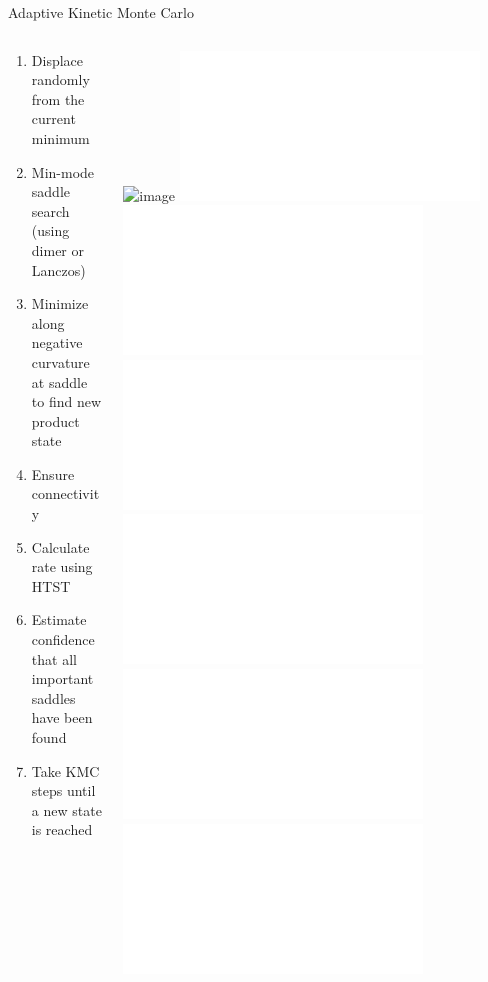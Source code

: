 \documentclass[onlymath]{beamer}
\begin{document}
\begin{frame}{Adaptive Kinetic Monte Carlo}
 \begin{columns}
    \begin{column}[l]{0.65\textwidth}
\begin{tcolorbox}[title=Algorithm,colback=white,colframe=black,]
\begin{enumerate}
	\item \alert<2-3,11>{Displace randomly from the current minimum}
	\item \alert<4-5>{Min-mode saddle search (using dimer or Lanczos)}
	\item \alert<6>{Minimize along negative curvature at saddle to find new product state}
	\item \alert<7>{Ensure connectivity}
	\item \alert<8>{Calculate rate using HTST}
	\item \alert<9,11>{Estimate confidence that all important saddles have been found}
	\item \alert<10>{Take KMC steps until a new state is reached}
\end{enumerate}
\end{tcolorbox}
         \end{column}
    \begin{column}[r]{0.35\textwidth}
        \includegraphics<1>[width=\columnwidth]{images/pes.png}
        \includegraphics<2>[width=\columnwidth]{images/minmode-basins-2.pdf}
        \includegraphics<3>[width=\columnwidth]{images/minmode-basins-3.pdf}
        \includegraphics<4>[width=\columnwidth]{images/minmode-near-saddle.pdf}
        \includegraphics<5>[width=\columnwidth]{images/minmode-basins-4.pdf}
        \includegraphics<6>[width=\columnwidth]{images/minmode-basins-5.pdf}
        \includegraphics<7>[width=\columnwidth]{images/minmode-basins-6.pdf}
	 	        
\end{column}
\end{columns}
\end{frame}
\end{document}
